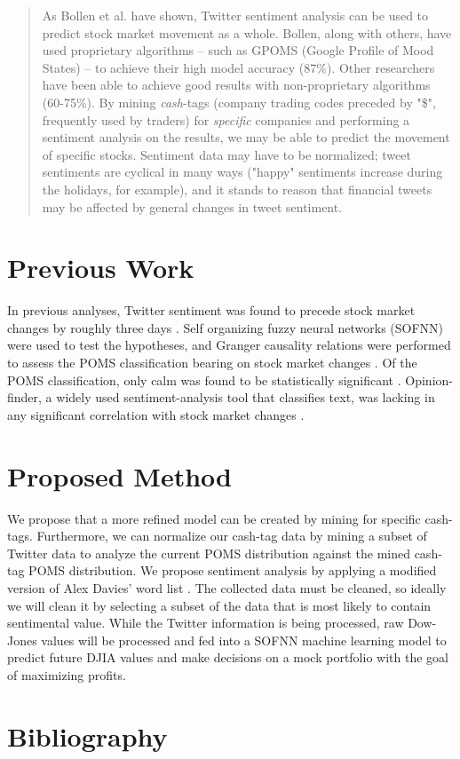 \begin{abstract}
As Bollen et al. have shown, Twitter sentiment analysis can be used to predict stock market movement as a whole. Bollen, along with others, have used proprietary algorithms -- such as GPOMS (Google Profile of Mood States) -- to achieve their high model accuracy (87\%). Other researchers have been able to achieve good results with non-proprietary algorithms (60-75\%). By mining \textit{cash}-tags (company trading codes preceded by "\$", frequently used by traders) for \textit{specific} companies and performing a sentiment analysis on the results, we may be able to predict the movement of specific stocks. Sentiment data may have to be normalized; tweet sentiments are cyclical in many ways ("happy" sentiments increase during the holidays, for example), and it stands to reason that financial tweets may be affected by general changes in tweet sentiment. 
\end{abstract}

\section{Previous Work}
In previous analyses, Twitter sentiment was found to precede stock market changes by roughly three days \cite{bollen-ieee}. Self organizing fuzzy neural networks (SOFNN) were used to test the hypotheses, and Granger causality relations were performed to assess the POMS classification bearing on stock market changes \cite{bollen-ieee} \cite{bollen-jcs} \cite{mittal}. Of the POMS classification, only calm was found to be statistically significant \cite{bollen-ieee}. Opinion-finder, a widely used sentiment-analysis tool that classifies text, was lacking in any significant correlation with stock market changes \cite{bollen-ieee}.

\section{Proposed Method}
We propose that a more refined model can be created by mining for specific cash-tags. Furthermore, we can normalize our cash-tag data by mining a subset of Twitter data to analyze the current POMS distribution against the mined cash-tag POMS distribution. We propose sentiment analysis by applying a modified version of Alex Davies' word list \cite{davies}. The collected data must be cleaned, so ideally we will clean it by selecting a subset of the data that is most likely to contain sentimental value. While the Twitter information is being processed, raw Dow-Jones values will be processed and fed into a SOFNN machine learning model to predict future DJIA values and make decisions on a mock portfolio with the goal of maximizing profits. 

\section{Bibliography}

